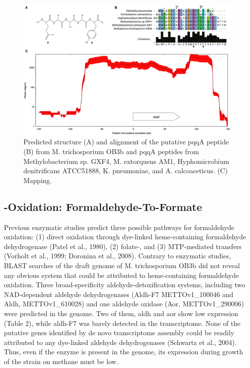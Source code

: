 \begin{figure}[H]
\centering
     \includegraphics[width=1.0\textwidth]{./tex/chapter1/figures/figure2.png}
     \caption{Predicted structure
        (A) and alignment of the putative pqqA peptide
        (B) from M. trichosporium OB3b and pqqA peptides from Methylobacterium sp. GXF4, M. extorquens AM1,
            Hyphomicrobium denitrificans ATCC51888, K. pneumoniae, and A. calcoaceticus.
        (C) Mapping.}
     \label{fig:B_pqqA}
\end{figure}


\subsection{-Oxidation: Formaldehyde-To-Formate}
Previous enzymatic studies predict three possible pathways for formaldehyde oxidation: (1) direct oxidation through dye-linked heme-containing formaldehyde dehydrogenase (Patel et al., 1980), (2) folate-, and (3) MTP-mediated  transfers (Vorholt et al., 1999; Doronina et al., 2008).
Contrary to enzymatic studies, BLAST searches of the draft genome of M. trichosporium OB3b did not reveal any obvious system that could be attributed to heme-containing formaldehyde oxidation.
Three broad-specificity aldehyde-detoxification systems, including two NAD-dependent aldehyde dehydrogenases (Aldh-F7 METTOv1\_100046 and Aldh, METTOv1\_610028) and one aldehyde oxidase (Aor, METTOv1\_290006) were predicted in the genome.
Two of them, aldh and aor show low expression (Table 2), while aldh-F7 was barely detected in the transcriptome.
None of the putative genes identified by de novo transcriptome assembly could be readily attributed to any dye-linked aldehyde dehydrogenases (Schwartz et al., 2004).
Thus, even if the enzyme is present in the genome, its expression during growth of the strain on methane must be low.

